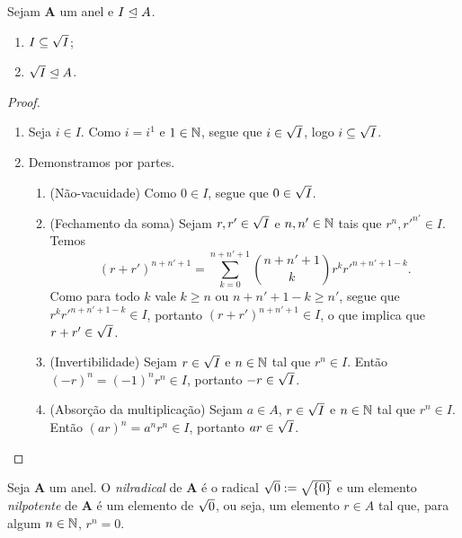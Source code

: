 \begin{proposition}
Sejam $\bm A$ um anel e $I \mathrel{\unlhd} A$.
	\begin{enumerate}
	\item $I \subseteq \sqrt{I}$;
	\item $\sqrt{I} \mathrel{\unlhd} A$.
	\end{enumerate}
\end{proposition}
\begin{proof}
	\begin{enumerate}
	\item Seja $i \in I$. Como $i=i^1$ e $1 \in \mathbb{N}$, segue que $i \in \sqrt{I}$, logo $i \subseteq \sqrt{I}$.
	
	\item Demonstramos por partes.
		\begin{enumerate}
		\item (Não-vacuidade) Como $0 \in I$, segue que $0 \in \sqrt{I}$.
		
		\item (Fechamento da soma) Sejam $r,r' \in \sqrt{I}$ e $n,n' \in \mathbb{N}$ tais que $r^n, {r'}^{n'} \in I$. Temos
		\begin{equation*}
		(r+r')^{n+n'+1} = \sum_{k=0}^{n+n'+1}  \binom{n+n'+1}{k} r^k {r'}^{n+n'+1-k}.
		\end{equation*}
Como para todo $k$ vale $k \geq n$ ou $n+n'+1-k \geq n'$, segue que $r^k {r'}^{n+n'+1-k} \in I$, portanto $(r+r')^{n+n'+1} \in I$, o que implica que $r+r' \in \sqrt{I}$.
		
		\item (Invertibilidade) Sejam $r \in \sqrt{I}$ e $n \in \mathbb{N}$ tal que $r^n \in I$. Então $(-r)^n = (-1)^n r^n \in I$, portanto $-r \in \sqrt{I}$.
		
		\item (Absorção da multiplicação) Sejam $a \in A$, $r \in \sqrt{I}$ e $n \in \mathbb{N}$ tal que $r^n \in I$. Então $(ar)^n = a^n r^n \in I$, portanto $ar \in \sqrt{I}$.
		\qedhere
		\end{enumerate}
	\end{enumerate}
\end{proof}

\begin{definition}
Seja $\bm A$ um anel. O \emph{nilradical} de $\bm A$ é o radical $\sqrt{0} := \sqrt{\{0\}}$ e um elemento \emph{nilpotente} de $\bm A$ é um elemento de $\sqrt{0}$, ou seja, um elemento $r \in A$ tal que, para algum $n \in \mathbb{N}$, $r^n=0$.
\end{definition}


